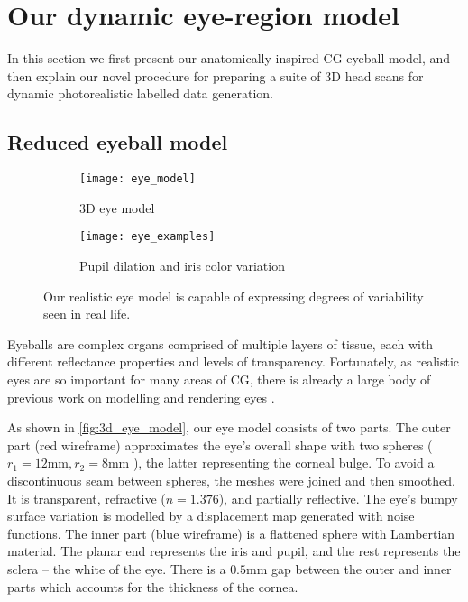 
\section{Our dynamic eye-region model}



In this section we first present our anatomically inspired CG eyeball model, and then explain our novel procedure for preparing a suite of 3D head scans for dynamic photorealistic labelled data generation.


\subsection{Reduced eyeball model}
\label{subsec:eyeball_model}

\begin{figure}
    \centering
    \begin{subfigure}[t]{0.33\columnwidth}
        \texttt{[image: eye\_model]}
        \caption{3D eye model}
        \label{fig:3d_eye_model}
    \end{subfigure}%
    \hfill
    \begin{subfigure}[t]{0.65\columnwidth}
        \texttt{[image: eye\_examples]}
        \caption{Pupil dilation and iris color variation}
    \end{subfigure}
    \caption{Our realistic eye model is capable of expressing degrees of variability seen in real life.}
    \label{fig:eye_model}
\end{figure}

Eyeballs are complex organs comprised of multiple layers of tissue, each with different reflectance properties and levels of transparency. Fortunately, as realistic eyes are so important for many areas of CG, there is already a large body of previous work on modelling and rendering eyes .


As shown in \autoref{fig:3d_eye_model}, our eye model consists of two parts.
%
The outer part (red wireframe) approximates the eye's overall shape with two spheres ($r_1\!=\!12\textrm{mm}, r_2\!=\!8\textrm{mm}$ \cite{ruhland2014look}), the latter representing the corneal bulge. To avoid a discontinuous seam between spheres, the meshes were joined and then smoothed. It is transparent, refractive ($n\!=\!1.376$), and partially reflective. The eye's bumpy surface variation is modelled by a displacement map generated with noise functions.
%
The inner part (blue wireframe) is a flattened sphere with Lambertian material. The planar end represents the iris and pupil, and the rest represents the sclera -- the white of the eye.
%
There is a $0.5\textrm{mm}$ gap between the outer and inner parts which accounts for the thickness of the cornea. 

